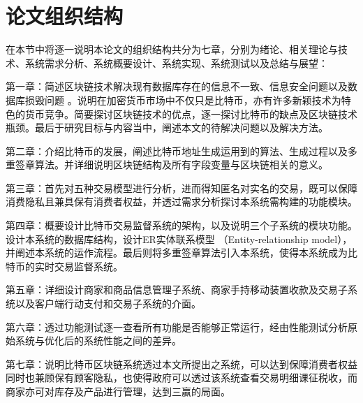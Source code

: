	\section{论文组织结构}
	在本节中将逐一说明本论文的组织结构共分为七章，分别为绪论、相关理论与技术、系统需求分析、系统概要设计、系统实现、系统测试以及总结与展望：

	第一章：简述区块链技术解决现有数据库存在的信息不一致、信息安全问题以及数据库损毁问题
	。说明在加密货币市场中不仅只是比特币，亦有许多新颖技术为特色的货币竞争。简要探讨区块链技术的优点，逐一探讨比特币的缺点及区块链技术瓶颈。最后于研究目标与内容当中，阐述本文的待解决问题以及解决方法。

	第二章：介绍比特币的发展，阐述比特币地址生成运用到的算法、生成过程以及多重签章算法。并详细说明区块链结构及所有字段变量与区块链相关的意义。

	第三章：首先对五种交易模型进行分析，进而得知匿名对实名的交易，既可以保障消费隐私且兼具保有消费者权益，并透过需求分析探讨本系统需构建的功能模块。

	第四章：概要设计比特币交易监督系统的架构，以及说明三个子系统的模块功能。设计本系统的数据库结构，设计ER实体联系模型 （Entity-relationship model），并阐述本系统的运作流程。最后则将多重签章算法引入本系统，使得本系统成为比特币的实时交易监督系统。

	第五章：详细设计商家和商品信息管理子系统、商家手持移动装置收款及交易子系统以及客户端行动支付和交易子系统的介面。

	第六章：透过功能测试逐一查看所有功能是否能够正常运行，经由性能测试分析原始系统与优化后的系统性能之间的差异。

	第七章：说明比特币区块链系统透过本文所提出之系统，可以达到保障消费者权益同时也兼顾保有顾客隐私，也使得政府可以透过该系统查看交易明细课征税收，而商家亦可对库存及产品进行管理，达到三赢的局面。
